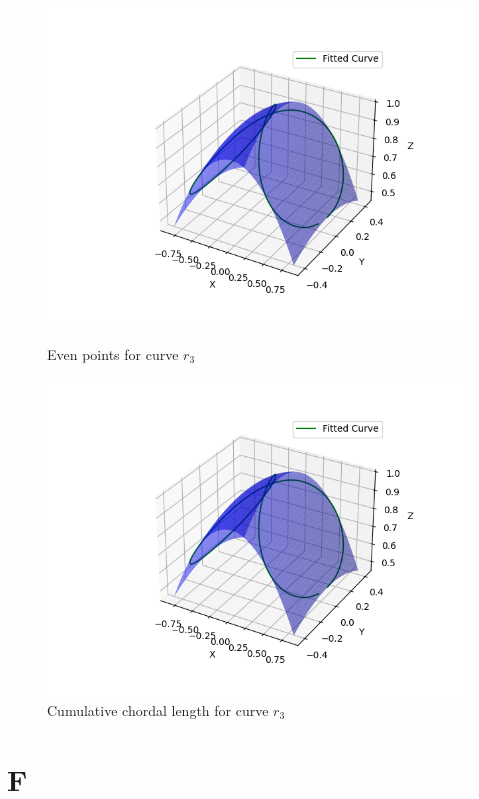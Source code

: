 \documentclass[a4paper]{article}
\begin{document}
\begin{figure}[h]
    \centering
    \begin{minipage}{0.45\textwidth}
        \centering
        \includegraphics[width=\linewidth]{../figure/r3_even.png}
        \caption{Even points for curve \(r_3\)}
    \end{minipage}%
    \hfill
    \begin{minipage}{0.45\textwidth}
        \centering
        \includegraphics[width=\linewidth]{../figure/r3_CCL.png}
        \caption{Cumulative chordal length for curve \(r_3\)}
    \end{minipage}
\end{figure}

\section*{F}
\end{document}
